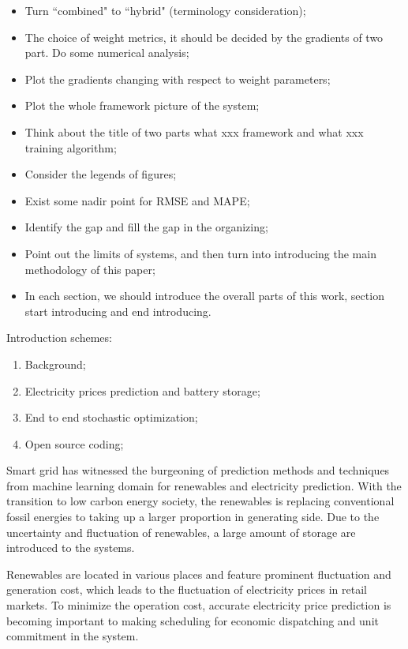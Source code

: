 \documentclass[journal]{IEEEtran}
\newcommand{\slw}{\color{blue}}
\begin{document}
\begin{itemize}
  \item Turn {\slw ``combined"} to {\slw ``hybrid"} (terminology consideration);
  \item {\slw The choice of weight metrics, it should be decided by the gradients of two part. Do some numerical analysis};
  \item {\slw Plot the gradients changing with respect to weight parameters};
  \item {\slw Plot the whole framework picture of the system};
  \item Think about the title of two parts {\slw what xxx framework} and {\slw what xxx training algorithm};
  \item {\slw Consider the legends of figures; }
  \item {\slw Exist some nadir point for RMSE and MAPE;}
  \item {\slw Identify the gap and fill the gap in the organizing;}
  \item {\slw Point out the limits of systems, and then turn into introducing the main methodology of this paper;}
  \item {\slw In each section, we should introduce the overall parts of this work, section start introducing and end introducing.}
\end{itemize}

Introduction schemes:
\begin{enumerate}
  \item Background;
  \item Electricity prices prediction and battery storage;
  \item End to end stochastic optimization;
  \item Open source coding;
\end{enumerate}

Smart grid has witnessed the burgeoning of prediction methods and techniques from machine learning domain for renewables and electricity prediction. With the transition to low carbon energy society, the renewables is replacing conventional fossil energies to taking up a larger proportion in generating side. Due to the uncertainty and fluctuation of renewables, a large amount of storage are introduced to the systems.

Renewables are located in various places and feature prominent fluctuation and generation cost, which leads to the fluctuation of electricity prices in retail markets. To minimize the operation cost, accurate electricity price prediction is becoming important to making scheduling for economic dispatching and unit commitment in the system.
\end{document}
